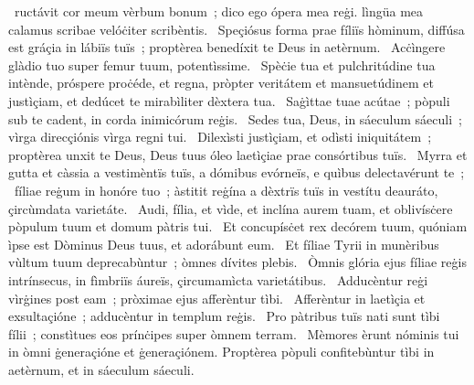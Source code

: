 \psalmChapterWithInscription{}
{ }
{%
~ructávit cor meum vèrbum bonum~; dico ego ópera mea reġi. lìngüa mea calamus scribae velóċiter scribèntis. 
~Speçiósus forma prae fíliïs hòminum, diffúsa est gráçia in lábiïs tuïs~; proptèrea benedíxit te Deus in aetèrnum. 
~Acċìngere glàdio tuo super femur tuum, potentìssime. 
~Spèċie tua et pulchritúdine tua intènde, próspere proċéde, et regna, pròpter veritátem et mansuetúdinem et justìçiam, et dedúcet te mirabìliter dèxtera tua. 
~Saġìttae tuae acútae~; pòpuli sub te cadent, in corda inimicórum reġis. 
~Sedes tua, Deus, in sáeculum sáeculi~; vìrga direcçiónis vìrga regni tui. 
~Dilexìsti justìçiam, et odìsti iniquitátem~; proptèrea unxit te Deus, Deus tuus óleo laetìçiae prae consórtibus tuïs. 
~Myrra et gutta et càssia a vestimèntïs tuïs, a dómibus evórneïs, e quìbus delectavérunt te~; 
~fíliae reġum in honóre tuo~; àstitit reġína a dèxtrïs tuïs in vestítu deauráto, çircùmdata varietáte. 
~Audi, fília, et vìde, et inclína aurem tuam, et oblivísċere pòpulum tuum et domum pàtris tui. 
~Et concupísċet rex decórem tuum, quóniam ìpse est Dòminus Deus tuus, et adorábunt eum. 
~Et fíliae Tyrii in munèribus vùltum tuum deprecabùntur~; òmnes dívites plebis. 
~Òmnis glória ejus fíliae reġis intrínsecus, in fìmbriïs áureïs, çircumamìcta varietátibus. 
~Adducèntur reġi vìrġines post eam~; pròximae ejus afferèntur tìbi. 
~Afferèntur in laetìçia et exsultaçióne~; adducèntur in templum reġis. 
~Pro pàtribus tuïs nati sunt tìbi fílii~; constìtues eos prínċipes super òmnem terram. 
~Mèmores èrunt nóminis tui in òmni ġeneraçióne et ġeneraçiónem. Proptèrea pòpuli confitebùntur tìbi in aetèrnum, et in sáeculum sáeculi. 
}

